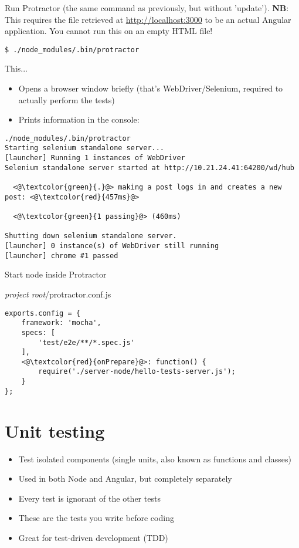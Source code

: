 \documentclass[british]{article}
\begin{document}
Run Protractor (the same command as previously, but without 'update'). \textbf{NB}: This requires the file retrieved at \url{http://localhost:3000} to be an actual Angular application. You cannot run this on an empty HTML file!

\begin{lstlisting}
$ ./node_modules/.bin/protractor    
\end{lstlisting}

This...
\begin{itemize}
  \item Opens a browser window briefly (that's WebDriver/Selenium, required to actually perform the tests)
  \item Prints information in the console:
\end{itemize}

\begin{lstlisting}
./node_modules/.bin/protractor
Starting selenium standalone server...
[launcher] Running 1 instances of WebDriver
Selenium standalone server started at http://10.21.24.41:64200/wd/hub

  <@\textcolor{green}{.}@> making a post logs in and creates a new post: <@\textcolor{red}{457ms}@>

  <@\textcolor{green}{1 passing}@> (460ms)

Shutting down selenium standalone server.
[launcher] 0 instance(s) of WebDriver still running
[launcher] chrome #1 passed    
\end{lstlisting}

Start node inside Protractor

\textit{project root}/protractor.conf.js
\begin{lstlisting}
exports.config = {
    framework: 'mocha',
    specs: [
        'test/e2e/**/*.spec.js'
    ],
    <@\textcolor{red}{onPrepare}@>: function() {
        require('./server-node/hello-tests-server.js');
    }
};
\end{lstlisting}

\section{Unit testing}

\begin{itemize}
  \item Test isolated components (single units, also known as functions and classes)
  \item Used in both Node and Angular, but completely separately
  \item Every test is ignorant of the other tests
  \item These are the tests you write before coding
  \item Great for test-driven development (TDD)
\end{itemize}
\end{document}
